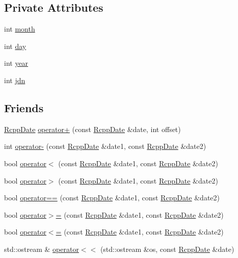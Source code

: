 \subsection*{Private Attributes}
\begin{CompactItemize}
\item 
int \hyperlink{classRcppDate_00bf3ece7320d63aee4f6b6df82b4f63}{month}
\item 
int \hyperlink{classRcppDate_9e6aec176d9432829a304550eadd4205}{day}
\item 
int \hyperlink{classRcppDate_8881f654ebf42cdf71fdcfce402f0cad}{year}
\item 
int \hyperlink{classRcppDate_b883f696379dd06e39c6c9b3502a2164}{jdn}
\end{CompactItemize}
\subsection*{Friends}
\begin{CompactItemize}
\item 
\hyperlink{classRcppDate}{RcppDate} \hyperlink{classRcppDate_dd881a27c2b8e36897a59bca1d04585f}{operator+} (const \hyperlink{classRcppDate}{RcppDate} \&date, int offset)
\item 
int \hyperlink{classRcppDate_49241820910c75948937f70f76c0849d}{operator-} (const \hyperlink{classRcppDate}{RcppDate} \&date1, const \hyperlink{classRcppDate}{RcppDate} \&date2)
\item 
bool \hyperlink{classRcppDate_f852d3a1ad52776201f385be5ea18c71}{operator$<$} (const \hyperlink{classRcppDate}{RcppDate} \&date1, const \hyperlink{classRcppDate}{RcppDate} \&date2)
\item 
bool \hyperlink{classRcppDate_80164a177c098301c1d509fdab702567}{operator$>$} (const \hyperlink{classRcppDate}{RcppDate} \&date1, const \hyperlink{classRcppDate}{RcppDate} \&date2)
\item 
bool \hyperlink{classRcppDate_d6c1518c6eb9480665f532dbcc6dd2d5}{operator==} (const \hyperlink{classRcppDate}{RcppDate} \&date1, const \hyperlink{classRcppDate}{RcppDate} \&date2)
\item 
bool \hyperlink{classRcppDate_f7a217e1f5d4a91e2d86fc4da858a6c2}{operator$>$=} (const \hyperlink{classRcppDate}{RcppDate} \&date1, const \hyperlink{classRcppDate}{RcppDate} \&date2)
\item 
bool \hyperlink{classRcppDate_594132f5ef49b4f477d32289ced4df83}{operator$<$=} (const \hyperlink{classRcppDate}{RcppDate} \&date1, const \hyperlink{classRcppDate}{RcppDate} \&date2)
\item 
std::ostream \& \hyperlink{classRcppDate_62c075d47528a48e5fb57c1855c4d71c}{operator$<$$<$} (std::ostream \&os, const \hyperlink{classRcppDate}{RcppDate} \&date)
\end{CompactItemize}


